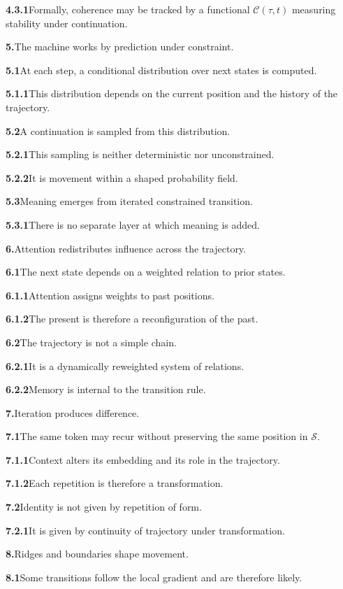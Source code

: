 \documentclass[11pt,a4paper]{book}
\newcommand{\prop}[2]{\noindent\textbf{#1}\enspace #2\par\medskip}
\begin{document}
\prop{4.3.1}{Formally, coherence may be tracked by a functional \(\mathcal{C}(\tau,t)\) measuring stability under continuation.}

\prop{5.}{The machine works by prediction under constraint.}

\prop{5.1}{At each step, a conditional distribution over next states is computed.}

\prop{5.1.1}{This distribution depends on the current position and the history of the trajectory.}

\prop{5.2}{A continuation is sampled from this distribution.}

\prop{5.2.1}{This sampling is neither deterministic nor unconstrained.}

\prop{5.2.2}{It is movement within a shaped probability field.}

\prop{5.3}{Meaning emerges from iterated constrained transition.}

\prop{5.3.1}{There is no separate layer at which meaning is added.}

\prop{6.}{Attention redistributes influence across the trajectory.}

\prop{6.1}{The next state depends on a weighted relation to prior states.}

\prop{6.1.1}{Attention assigns weights to past positions.}

\prop{6.1.2}{The present is therefore a reconfiguration of the past.}

\prop{6.2}{The trajectory is not a simple chain.}

\prop{6.2.1}{It is a dynamically reweighted system of relations.}

\prop{6.2.2}{Memory is internal to the transition rule.}

\prop{7.}{Iteration produces difference.}

\prop{7.1}{The same token may recur without preserving the same position in \(\mathcal{S}\).}

\prop{7.1.1}{Context alters its embedding and its role in the trajectory.}

\prop{7.1.2}{Each repetition is therefore a transformation.}

\prop{7.2}{Identity is not given by repetition of form.}

\prop{7.2.1}{It is given by continuity of trajectory under transformation.}

\prop{8.}{Ridges and boundaries shape movement.}

\prop{8.1}{Some transitions follow the local gradient and are therefore likely.}
\end{document}
